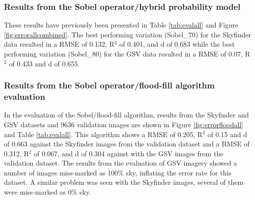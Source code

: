 \documentclass[final,3p,times,authoryear]{elsarticle}
\begin{document}
\subsubsection{Results from the \cite{Wang2015a} Sobel operator/hybrid probability model}
These results have previously been presented in Table \ref{tab:evalall} and Figure \ref{fig:errorallcombined}. The best performing variation (Sobel\_70) for the Skyfinder data resulted in a RMSE of 0.132, R$^{2}$ of 0.401, and d of 0.683 while the best performing variation (Sobel\_80) for the GSV data resulted in a RMSE of 0.07, R$^{2}$ of 0.433 and d of 0.655.

\subsubsection{Results from the \cite{Middel2018} Sobel operator/flood-fill algorithm evaluation}\label{sec:resultsflood}
In the evaluation of the Sobel/flood-fill algorithm, results from the Skyfinder and GSV datasets and 9636 validation images are shown in Figure \ref{fig:errorfloodall} and Table \ref{tab:evalall}. This algorithm shows a RMSE of 0.205, R$^{2}$ of 0.15 and d of 0.663 against the Skyfinder images from the validation dataset and a RMSE of 0.312, R$^{2}$ of 0.067, and d of 0.304 against with the GSV images from the validation dataset. The results from the evaluation of GSV imagery showed a number of images miss-marked as 100\% sky, inflating the error rate for this dataset. A similar problem was seen with the Skyfinder images, several of them were miss-marked as 0\% sky.
\end{document}
